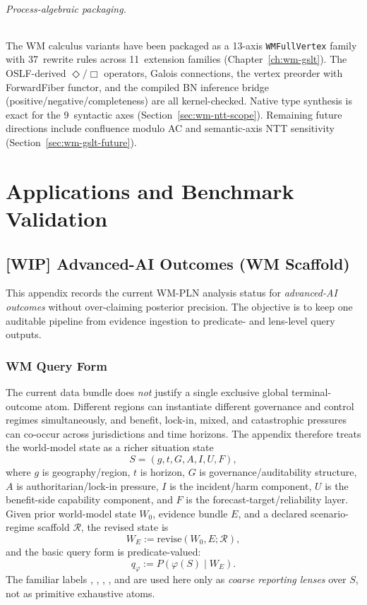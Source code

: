 \documentclass[11pt,openany]{report}
\begin{document}
\paragraph{Process-algebraic packaging.}
The WM calculus variants have been packaged as a 13-axis
\texttt{WMFullVertex} family with 37~rewrite rules across 11~extension
families (Chapter~\ref{ch:wm-gslt}).  The OSLF-derived $\Diamond/\Box$
operators, Galois connections, the vertex preorder with ForwardFiber
functor, and the compiled BN inference bridge (positive/negative/completeness)
are all kernel-checked.  Native type synthesis is exact for the 9~syntactic
axes (Section~\ref{sec:wm-ntt-scope}).  Remaining future directions
include confluence modulo AC and semantic-axis NTT sensitivity
(Section~\ref{sec:wm-gslt-future}).


\part{Applications and Benchmark Validation}
\label{part:applications}

\chapter{[WIP] Advanced-AI Outcomes (WM Scaffold)}
\label{app:ai-outcomes}

This appendix records the current WM-PLN analysis status for
\emph{advanced-AI outcomes} without over-claiming posterior precision.
The objective is to keep one auditable pipeline from evidence ingestion
to predicate- and lens-level query outputs.

\section{WM Query Form}

The current data bundle does \emph{not} justify a single exclusive
global terminal-outcome atom.  Different regions can instantiate
different governance and control regimes simultaneously, and benefit,
lock-in, mixed, and catastrophic pressures can co-occur across
jurisdictions and time horizons.  The appendix therefore treats the
world-model state as a richer situation state
\[
  S = (g, t, G, A, I, U, F),
\]
where $g$ is geography/region, $t$ is horizon, $G$ is
governance/auditability structure, $A$ is authoritarian/lock-in
pressure, $I$ is the incident/harm component, $U$ is the benefit-side
capability component, and $F$ is the forecast-target/reliability layer.
Given prior world-model state $W_0$, evidence bundle $E$, and a declared
scenario-regime scaffold $\mathcal{R}$, the revised state is
\[
  W_E := \mathrm{revise}(W_0, E; \mathcal{R}),
\]
and the basic query form is predicate-valued:
\[
  q_{\varphi} := P(\varphi(S) \mid W_E).
\]
The familiar labels
,
,
,
, and  are used here
only as \emph{coarse reporting lenses} over $S$, not as primitive
exhaustive atoms.
\end{document}
